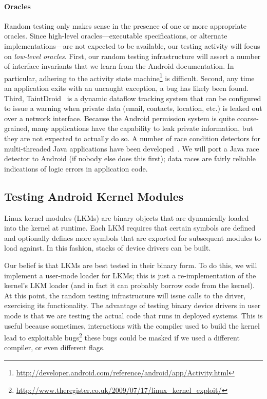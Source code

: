 \paragraph{Oracles}

Random testing only makes sense in the presence of one or more
appropriate oracles.
%
Since high-level oracles---executable specifications, or alternate
implementations---are not expected to be available, our testing
activity will focus on \emph{low-level oracles}.
%
First, our random testing infrastructure will assert a number of
interface invariants that we learn from the Android documentation.
%
In particular, adhering to the activity state
machine\footnote{\url{http://developer.android.com/reference/android/app/Activity.html}}
is difficult.
%
Second, any time an application exits with an uncaught exception, a bug
has likely been found.
%
Third, TaintDroid~\cite{Enck10} is a dynamic dataflow tracking system
that can be configured to issue a warning when private data (email,
contacts, location, etc.) is leaked out over a network interface.
%
Because the Android permission system is quite coarse-grained, many
applications have the capability to leak private information, but they
are not expected to actually do so.
%
A number of race condition detectors for multi-threaded Java applications
have been developed~\cite{Elmas07,Flanagan09}.
%
We will port a Java race detector to Android (if nobody else does
this first); data races are fairly reliable indications of logic
errors in application code.


\subsection{Testing Android Kernel Modules}

Linux kernel modules (LKMs) are binary objects that are dynamically
loaded into the kernel at runtime.
%
Each LKM requires that certain symbols are defined and optionally
defines more symbols that are exported for subsequent modules to load
against.
%
In this fashion, stacks of device drivers can be built.


Our belief is that LKMs are best tested in their binary form.
%
To do this, we will implement a user-mode loader for LKMs; 
this is just a re-implementation of the kernel's LKM loader (and in
fact it can probably borrow code from the kernel).
%
At this point, the random testing infrastructure will issue calls
to the driver, exercising its functionality.
%
The advantage of testing binary device drivers in user mode is that we
are testing the actual code that runs in deployed systems.
%
This is useful because sometimes, interactions with the compiler used
to build the kernel lead to exploitable
bugs\footnote{\url{http://www.theregister.co.uk/2009/07/17/linux_kernel_exploit/}}
these bugs could be masked if we used a different compiler, or
even different flags.



